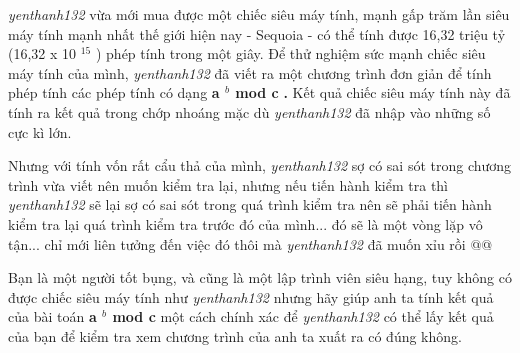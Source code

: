 \emph{      yenthanh132     }     vừa mới mua được một chiếc siêu máy tính, mạnh gấp trăm lần siêu máy tính mạnh nhất thế giới hiện nay - Sequoia - có thể tính được 16,32 triệu tỷ (16,32 x 10    $^      15     $     ) phép tính trong một giây. Để thử nghiệm sức mạnh chiếc siêu máy tính của mình,    \emph{      yenthanh132     }     đã viết ra một chương trình đơn giản để tính phép tính các phép tính có dạng    \textbf{      a     $^       b      $      mod c     }\textbf{      .     }\textbf{}     Kết quả chiếc siêu máy tính này đã tính ra kết quả trong chớp nhoáng mặc dù    \emph{      yenthanh132     }     đã nhập vào những số cực kì lớn.    



     Nhưng với tính vốn rất cẩu thả của mình,    \emph{      yenthanh132     }     sợ có sai sót trong chương trình vừa viết nên muốn kiểm tra lại, nhưng nếu tiến hành kiểm tra thì    \emph{      yenthanh132     }     sẽ lại sợ có sai sót trong quá trình kiểm tra nên sẽ phải tiến hành kiểm tra lại quá trình kiểm tra trước đó của mình... đó sẽ là một vòng lặp vô tận... chỉ mới liên tưởng đến việc đó thôi mà    \emph{      yenthanh132     }     đã muốn xỉu rồi @@    



     Bạn là một người tốt bụng, và cũng là một lập trình viên siêu hạng, tuy không có được chiếc siêu máy tính như    \emph{      yenthanh132     }     nhưng hãy giúp anh ta tính kết quả của bài toán    \textbf{      a     $^       b      $      mod c     }     một cách chính xác để    \emph{      yenthanh132     }     có thể lấy kết quả của bạn để kiểm tra xem chương trình của anh ta xuất ra có đúng không.
